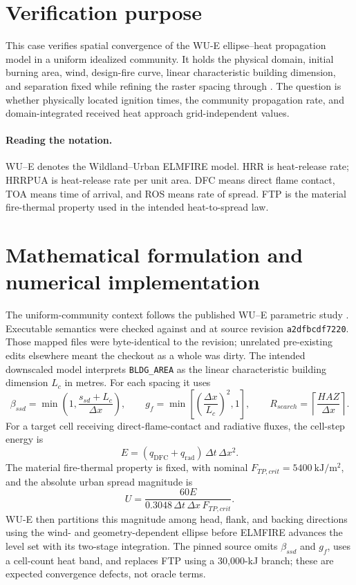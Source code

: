 \section{Verification purpose}
This case verifies spatial convergence of the WU-E ellipse--heat propagation model in a uniform idealized community. It holds the physical domain, initial burning area, wind, design-fire curve, linear characteristic building dimension, and separation fixed while refining the raster spacing through \GridSet. The question is whether physically located ignition times, the community propagation rate, and domain-integrated received heat approach grid-independent values.


\paragraph{Reading the notation.}
WU--E denotes the Wildland--Urban ELMFIRE model. HRR is heat-release rate;
HRRPUA is heat-release rate per unit area. DFC means direct flame contact,
TOA means time of arrival, and ROS means rate of spread. FTP is the material
fire-thermal property used in the intended heat-to-spread law.

\ReportOverview

\section{Mathematical formulation and numerical implementation}
The uniform-community context follows the published WU--E parametric study
\cite{PurnomoIJWF2024}. Executable semantics were checked
against  and
 at source revision
\texttt{a2dfbcdf7220}.  Those mapped files were byte-identical to the revision;
unrelated pre-existing edits elsewhere meant the checkout as a whole was dirty.
The intended downscaled model interprets \texttt{BLDG\_AREA} as the linear
characteristic building dimension $L_c$ in metres. For each spacing it uses
\begin{equation}
 \beta_{ssd}=\min\!\left(1,\frac{s_{sd}+L_c}{\Delta x}\right),\qquad
 g_f=\min\!\left[\left(\frac{\Delta x}{L_c}\right)^2,1\right],\qquad
 R_{search}=\left\lceil\frac{HAZ}{\Delta x}\right\rceil .
\end{equation}
For a target cell receiving direct-flame-contact and radiative fluxes, the cell-step energy is
\begin{equation}
 E=(q_{\mathrm{DFC}}+q_{\mathrm{rad}})\,\Delta t\,\Delta x^2.
\end{equation}
The material fire-thermal property is fixed, with nominal
$F_{TP,crit}=5400~\si{\kilo\joule\per\square\metre}$, and the absolute urban spread magnitude is
\begin{equation}
 U=\frac{60E}{0.3048\,\Delta t\,\Delta x\,F_{TP,crit}}.
\end{equation}
WU-E then partitions this magnitude among head, flank, and backing directions
using the wind- and geometry-dependent ellipse before ELMFIRE advances the
level set with its two-stage integration. The pinned source omits
$\beta_{ssd}$ and $g_f$, uses a cell-count heat band, and replaces FTP using a
30,000-kJ branch; these are expected convergence defects, not oracle terms.


